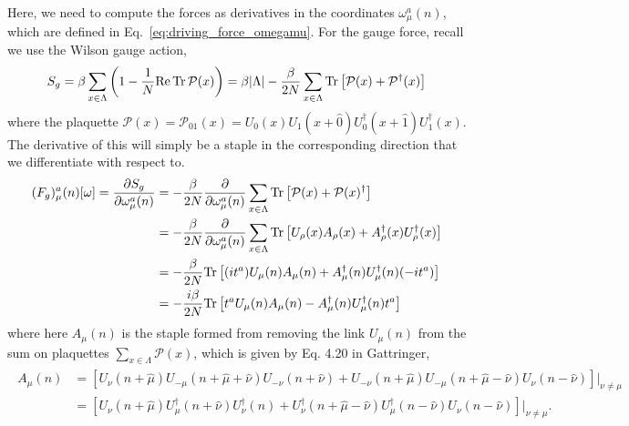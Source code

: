 Here, we need to compute the forces as derivatives in the coordinates $\omega_\mu^a(n)$, which are defined in Eq.~\eqref{eq:driving_force_omegamu}. For the gauge force, recall we use the Wilson gauge action,
\begin{equation}
	S_g = \beta \sum_{x\in\Lambda} \left( 1 - \frac{1}{N} \mathrm{Re}\, \mathrm{Tr}\, \mathcal P(x) \right) = \beta |\Lambda| - \frac{\beta}{2N} \sum_{x\in\Lambda} \mathrm{Tr} \left[ \mathcal P(x) + \mathcal P^\dagger(x) \right]
\end{equation}
where the plaquette $\mathcal P(x) = \mathcal P_{01}(x) = U_0(x) U_1(x + \hat 0) U_0^\dagger(x + \hat 1) U_1^\dagger(x)$. The derivative of this will simply be a staple in the corresponding direction that we differentiate with respect to. 
\begin{align}\begin{split}
	(F_g)_\mu^a(n)[\omega] = \frac{\partial S_g}{\partial \omega_\mu^a(n)} &= -\frac{\beta}{2N} \frac{\partial}{\partial \omega_\mu^a(n)} \sum_{x\in\Lambda} \mathrm{Tr} \left[ \mathcal P(x) + \mathcal P(x)^\dagger \right] \\
	&= -\frac{\beta}{2N} \frac{\partial}{\partial \omega_\mu^a(n)} \sum_{x\in\Lambda} \mathrm{Tr} \left[ U_\rho(x) A_\rho(x) + A_\rho^\dagger(x) U_\rho^\dagger(x) \right] \\
	&= -\frac{\beta}{2N} \mathrm{Tr} \left[ (it^a) U_\mu(n) A_\mu(n) + A_\mu^\dagger(n) U_\mu^\dagger(n) (-it^a) \right] \\
	&= -\frac{i\beta}{2N} \mathrm{Tr} \left[ t^a U_\mu(n) A_\mu(n) - A_\mu^\dagger(n) U_\mu^\dagger(n) t^a \right]
	\label{eq:gauge_force_omega}
\end{split}\end{align}
where here $A_\mu(n)$ is the staple formed from removing the link $U_\mu(n)$ from the sum on plaquettes $\sum_{x\in\Lambda} \mathcal P(x)$, which is given by Eq. 4.20 in Gattringer,
\begin{align}\begin{split}
	A_\mu(n) &= \left[ U_\nu(n + \hat\mu) U_{-\mu}(n + \hat\mu + \hat\nu) U_{-\nu} (n + \hat\nu) + U_{-\nu} (n + \hat\mu) U_{-\mu} (n + \hat\mu - \hat\nu) U_\nu(n - \hat\nu) \right] \bigg|_{\nu\neq \mu} \\
	&= \left[U_\nu(n + \hat\mu) U_\mu^\dagger(n + \hat\nu) U_\nu^\dagger(n) + U_\nu^\dagger(n + \hat\mu - \hat\nu) U_\mu^\dagger(n - \hat\nu) U_\nu(n - \hat\nu) \right] \bigg|_{\nu\neq \mu}.
\end{split}\end{align}

